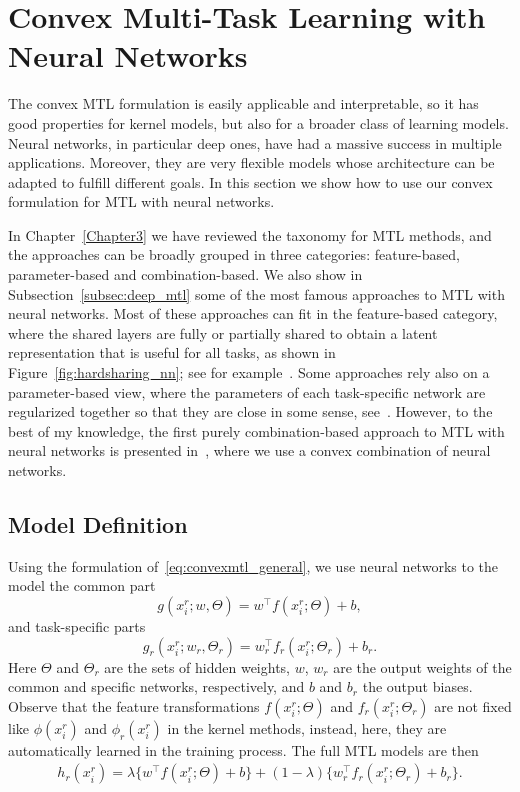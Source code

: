 \section{Convex Multi-Task Learning with Neural Networks}
The convex MTL formulation is easily applicable and interpretable, so it has good properties for kernel models, but also for a broader class of learning models.
Neural networks, in particular deep ones, have had a massive success in multiple applications. Moreover, they are very flexible models whose architecture can be adapted to fulfill different goals. In this section we show how to use our convex formulation for MTL with neural networks.

%
In Chapter~\ref{Chapter3} we have reviewed the taxonomy for MTL methods, and the approaches can be broadly grouped in three categories: feature-based, parameter-based and combination-based. 
We also show in Subsection~\ref{subsec:deep_mtl} some of the most famous approaches to MTL with neural networks. Most of these approaches can fit in the feature-based category, where the shared layers are fully or partially shared to obtain a latent representation that is useful for all tasks, as shown in Figure~\ref{fig:hardsharing_nn}; see for example~\cite{Caruana97, MisraSGH16,RuderBAS17}. Some approaches rely also on a parameter-based view, where the parameters of each task-specific network are regularized together so that they are close in some sense, see~\cite{Long015a, YangH17a}.
However, to the best of my knowledge, the first purely combination-based approach to MTL with neural networks is presented in~\cite{RuizAD22_hais}, where we use a convex combination of neural networks.



\subsection{Model Definition}
Using the formulation of~\eqref{eq:convexmtl_general}, we use neural networks to the model the common part 
$$ g(x_i^r; w, \Theta) = w^\intercal f(x_i^r; \Theta) + b,$$
and task-specific parts
$$ g_r(x_i^r; w_r, \Theta_r) =  w_r^\intercal f_r(x_i^r; \Theta_r) + b_r.$$
Here $\Theta$ and $\Theta_r$ are the sets of hidden weights, $w$, $w_r$ are the output weights of the common and specific networks, respectively, and $b$ and $b_r$ the output biases.
Observe that the feature transformations $ f(x_i^r; \Theta)$ and $f_r(x_i^r; \Theta_r)$ are not fixed like $\phi(x_i^r)$ and $\phi_r(x_i^r)$ in the kernel methods, instead, here, they are automatically learned in the training process.
The full MTL models are then
\begin{equation}
    \label{eq:convexmtl_nn}
    \begin{aligned}
        h_r(x_i^r)
       = \lambda \lbrace w^\intercal f(x_i^r; \Theta) + b \rbrace + (1 - \lambda) \lbrace w_r^\intercal f_r(x_i^r; \Theta_r) + b_r \rbrace.
    \end{aligned}    
\end{equation}

